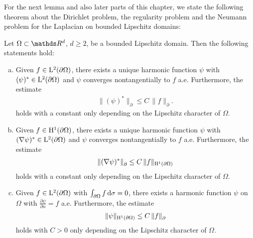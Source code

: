 For the next lemma and also later parts of this chapter, we state the following theorem about the Dirichlet problem, the regularity problem and the Neumann problem for the Laplacian on bounded Lipschitz domains:
\begin{thm}
  \label{thm:jerisonKenig}
  Let $\Omega \subset \R^d$, $d \geq 2$, be a bounded Lipschitz domain. Then the following statements hold:
  \begin{enumerate}[a)]
    \item\label{item:a} Given $f \in \mathrm{L}^2(\partial\Omega)$, there exists a unique harmonic function $\psi$ with $(\psi)^* \in \mathrm{L}^2(\partial\Omega)$ and $\psi$ converges nontangentially to $f$ a.e.
      Furthermore, the estimate 
      \begin{align*}
        \|(\psi)^* \|_\partial \leq C \, \|f\|_\partial.
      \end{align*}
      holds with a constant only depending on the Lipschitz character of $\Omega$.
    \item\label{item:b} Given $f \in \mathrm{H}^1(\partial\Omega)$, there exists a unique harmonic function $\psi$ with $(\nabla \psi)^* \in \mathrm{L}^2(\partial\Omega)$ and $\psi$ converges nontangentially to $f$ a.e.
      Furthermore, the estimate 
      \begin{align*}
        \|(\nabla\psi)^*\|^{}_\partial \leq C\, \|f\|_{\mathrm{H}^1(\partial\Omega)}
      \end{align*}
      holds with a constant only depending on the Lipschitz character of $\Omega$.
    \item\label{item:c} Given $f \in \mathrm{L}^2(\partial\Omega)$ with $\int_{\partial\Omega} f \, {\operatorname{d}\!{\sigma}} = 0$, there exists a harmonic function $\psi$ on $\Omega$ with $\frac{\partial\psi}{\partial n} = f$ a.e. 
      Furthermore, the estimate
      \begin{align*}
          \| \psi\|_{\mathrm{H}^1(\partial\Omega)} \leq C\, \|f\|^{}_\partial
      \end{align*}
      holds with $C > 0$  only depending on the Lipschitz character of $\Omega$.
  \end{enumerate}
\end{thm}

